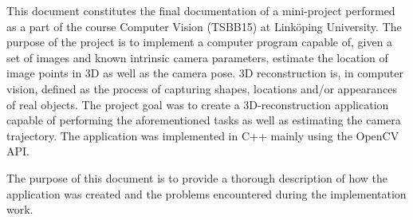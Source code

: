 This document constitutes the final documentation of a mini-project performed as a part of the course Computer Vision (TSBB15) at Linköping University. The purpose of the project is to implement a computer program capable of, given a set of images and known intrinsic camera parameters, estimate the location of image points in 3D as well as the camera pose. 3D reconstruction is, in computer vision, defined as the process of capturing shapes, locations and/or appearances of real objects. The project goal was to create a 3D-reconstruction application capable of performing the aforementioned tasks as well as estimating the camera trajectory. The application was implemented in C++ mainly using the OpenCV API.

The purpose of this document is to provide a thorough description of how the application was created and the problems encountered during the implementation work.